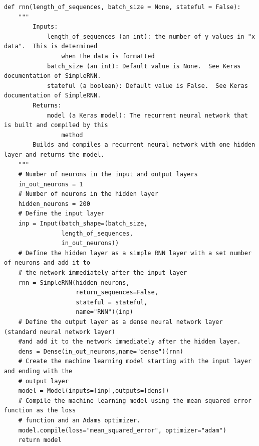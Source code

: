\documentclass[%
oneside,                 %
final,                   %
10pt]{article}
\begin{document}
\begin{verbatim}
def rnn(length_of_sequences, batch_size = None, stateful = False):
    """
        Inputs:
            length_of_sequences (an int): the number of y values in "x data".  This is determined
                when the data is formatted
            batch_size (an int): Default value is None.  See Keras documentation of SimpleRNN.
            stateful (a boolean): Default value is False.  See Keras documentation of SimpleRNN.
        Returns:
            model (a Keras model): The recurrent neural network that is built and compiled by this
                method
        Builds and compiles a recurrent neural network with one hidden layer and returns the model.
    """
    # Number of neurons in the input and output layers
    in_out_neurons = 1
    # Number of neurons in the hidden layer
    hidden_neurons = 200
    # Define the input layer
    inp = Input(batch_shape=(batch_size, 
                length_of_sequences, 
                in_out_neurons))  
    # Define the hidden layer as a simple RNN layer with a set number of neurons and add it to 
    # the network immediately after the input layer
    rnn = SimpleRNN(hidden_neurons, 
                    return_sequences=False,
                    stateful = stateful,
                    name="RNN")(inp)
    # Define the output layer as a dense neural network layer (standard neural network layer)
    #and add it to the network immediately after the hidden layer.
    dens = Dense(in_out_neurons,name="dense")(rnn)
    # Create the machine learning model starting with the input layer and ending with the 
    # output layer
    model = Model(inputs=[inp],outputs=[dens])
    # Compile the machine learning model using the mean squared error function as the loss 
    # function and an Adams optimizer.
    model.compile(loss="mean_squared_error", optimizer="adam")  
    return model


\end{verbatim}


\end{document}
